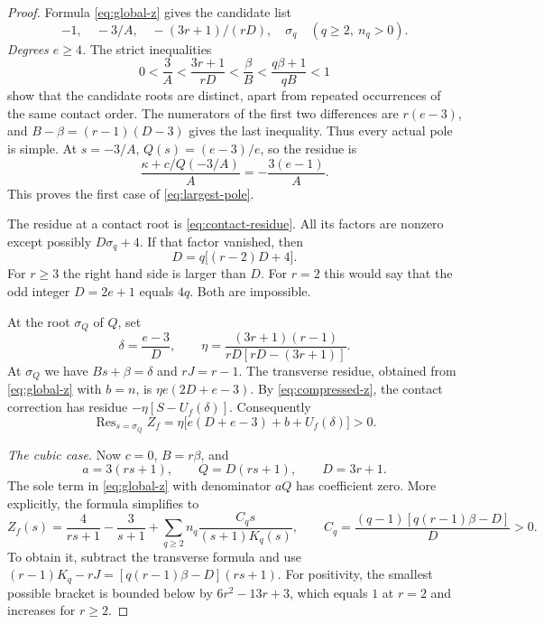 \documentclass[11pt]{article}
\numberwithin{equation}{section}
\theoremstyle{definition}
\theoremstyle{remark}
\DeclareMathOperator{\Res}{Res}
\begin{document}
\begin{proof}
Formula \eqref{eq:global-z} gives the candidate list
\begin{equation}\label{eq:candidates}
 -1,\quad -3/A,\quad -(3r+1)/(rD),\quad
 \sigma_q\quad(q\ge2,\ n_q>0).
\end{equation}
\emph{Degrees $e\ge4$.}
The strict inequalities
\begin{equation}\label{eq:pole-order}
 0<\frac3A<\frac{3r+1}{rD}<\frac{\beta}{B}
      <\frac{q\beta+1}{qB}<1
\end{equation}
show that the candidate roots are distinct, apart from repeated
occurrences of the same contact order. The numerators of the
first two differences are $r(e-3)$, and
$B-\beta=(r-1)(D-3)$ gives the last inequality.
Thus every actual pole is simple. At $s=-3/A$,
$Q(s)=(e-3)/e$, so the residue is
\[
 \frac{\kappa+c/Q(-3/A)}A=-\frac{3(e-1)}A.
\]
This proves the first case of \eqref{eq:largest-pole}.

The residue at a contact root is \eqref{eq:contact-residue}.
All its factors are nonzero except possibly $D\sigma_q+4$.
If that factor vanished, then
\[
 D=q\bigl[(r-2)D+4\bigr].
\]
For $r\ge3$ the right hand side is larger than $D$.
For $r=2$ this would say that the odd integer $D=2e+1$
equals $4q$. Both are impossible.

At the root $\sigma_Q$ of $Q$, set
\[
 \delta=\frac{e-3}{D},\qquad
 \eta=\frac{(3r+1)(r-1)}{rD[rD-(3r+1)]}.
\]
At $\sigma_Q$ we have $Bs+\beta=\delta$ and $rJ=r-1$.
The transverse residue, obtained from \eqref{eq:global-z}
with $b=n$, is $\eta e(2D+e-3)$. By
\eqref{eq:compressed-z}, the contact correction has residue
$-\eta[S-U_f(\delta)]$. Consequently
\begin{equation}\label{eq:old-positive-residue}
 \Res_{s=\sigma_Q}Z_f
    =\eta\bigl[e(D+e-3)+b+U_f(\delta)\bigr]>0.
\end{equation}

\emph{The cubic case.}
Now $c=0$, $B=r\beta$, and
\[
 a=3(rs+1),\qquad Q=D(rs+1),\qquad D=3r+1.
\]
The sole term in \eqref{eq:global-z} with denominator $aQ$
has coefficient zero. More explicitly, the formula simplifies
to
\begin{equation}\label{eq:cubic-formula}
 Z_f(s)=\frac4{rs+1}-\frac3{s+1}
       +\sum_{q\ge2}n_q\frac{C_qs}{(s+1)K_q(s)},
 \qquad
 C_q=\frac{(q-1)[q(r-1)\beta-D]}D>0.
\end{equation}
To obtain it, subtract the transverse formula and use
$(r-1)K_q-rJ=[q(r-1)\beta-D](rs+1)$.
For positivity, the smallest possible bracket is bounded below
by $6r^2-13r+3$, which equals $1$ at $r=2$ and increases for
$r\ge2$.


\end{proof}
\end{document}
